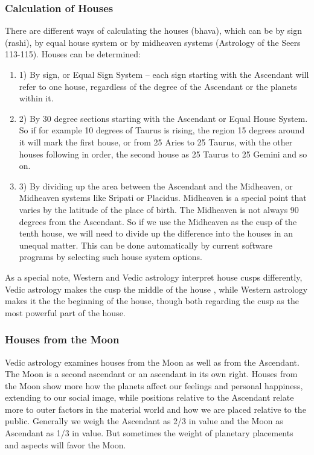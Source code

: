  

\subsubsection{Calculation of Houses}
 

There are different ways of calculating the houses (bhava), which can be by sign (rashi), by equal house system or by midheaven systems (Astrology of the Seers 113-115). Houses can be determined:

 

\begin{enumerate}
\item[] 1) By sign, or Equal Sign System – each sign starting with the Ascendant will refer to one house, regardless of the degree of the Ascendant or the planets within it.

\item[] 2) By 30 degree sections starting with the Ascendant or Equal House System. So if for example 10 degrees of Taurus is rising, the region 15 degrees around it will mark the first house, or from 25 Aries to 25 Taurus, with the other houses following in order, the second house as 25 Taurus to 25 Gemini and so on.

\item[] 3) By dividing up the area between the Ascendant and the Midheaven, or Midheaven systems like Sripati or Placidus. Midheaven is a special point that varies by the latitude of the place of birth. The Midheaven is not always 90 degrees from the Ascendant. So if we use the Midheaven as the cusp of the tenth house, we will need to divide up the difference into the houses in an unequal matter. This can be done automatically by current software programs by selecting such house system options.
\end{enumerate}
 

As a special note, Western and Vedic astrology interpret house cusps differently, Vedic astrology makes the cusp the middle of the house , while Western astrology makes it the the beginning of the house, though both regarding the cusp as the most powerful part of the house.

 

\subsubsection{Houses from the Moon}

 

Vedic astrology examines houses from the Moon as well as from the Ascendant. The Moon is a second ascendant or an ascendant in its own right. Houses from the Moon show more how the planets affect our feelings and personal happiness, extending to our social image, while positions relative to the Ascendant relate more to outer factors in the material world and how we are placed relative to the public. Generally we weigh the Ascendant as 2/3 in value and the Moon as Ascendant as 1/3 in value. But sometimes the weight of planetary placements and aspects will favor the Moon.

